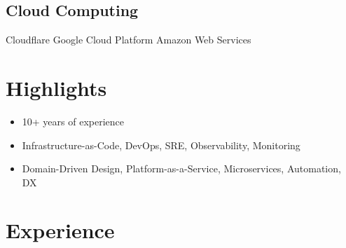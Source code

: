\documentclass[]{cv-style}                     %
\begin{document}
\begin{aside}
\section{Cloud Computing}
Cloudflare
Google Cloud Platform
Amazon Web Services
%
%
\end{aside}



\section{Highlights}


\begin{itemize}
  \setlength{\itemsep}{-4pt}
  \item 10+ years of experience
  \item Infrastructure-as-Code, DevOps, SRE, Observability, Monitoring
  \item Domain-Driven Design, Platform-as-a-Service, Microservices, Automation, DX
\end{itemize}



\section{Experience}
\end{document}
